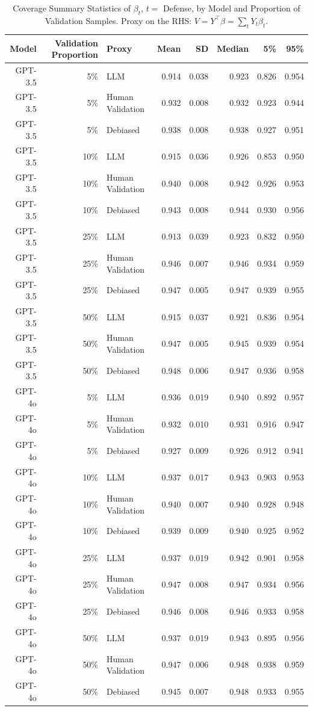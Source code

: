 \begin{table}

\caption{\label{tab:unnamed-chunk-1}Coverage Summary Statistics of $\beta_{t}$, $t=$ Defense, by Model and Proportion of Validation Samples.
      Proxy on the RHS: $V = Y^\top \beta = \sum_{t} Y_t \beta_t$.}
\centering
\begin{tabular}[t]{rrlrrrrr}
\toprule
Model & Validation Proportion & Proxy & Mean & SD & Median & 5\% & 95\%\\
\midrule
GPT-3.5 & 5\% & LLM & 0.914 & 0.038 & 0.923 & 0.826 & 0.954\\
GPT-3.5 & 5\% & Human Validation & 0.932 & 0.008 & 0.932 & 0.923 & 0.944\\
GPT-3.5 & 5\% & Debiased & 0.938 & 0.008 & 0.938 & 0.927 & 0.951\\
GPT-3.5 & 10\% & LLM & 0.915 & 0.036 & 0.926 & 0.853 & 0.950\\
GPT-3.5 & 10\% & Human Validation & 0.940 & 0.008 & 0.942 & 0.926 & 0.953\\
GPT-3.5 & 10\% & Debiased & 0.943 & 0.008 & 0.944 & 0.930 & 0.956\\
GPT-3.5 & 25\% & LLM & 0.913 & 0.039 & 0.923 & 0.832 & 0.950\\
GPT-3.5 & 25\% & Human Validation & 0.946 & 0.007 & 0.946 & 0.934 & 0.959\\
GPT-3.5 & 25\% & Debiased & 0.947 & 0.005 & 0.947 & 0.939 & 0.955\\
GPT-3.5 & 50\% & LLM & 0.915 & 0.037 & 0.921 & 0.836 & 0.954\\
GPT-3.5 & 50\% & Human Validation & 0.947 & 0.005 & 0.945 & 0.939 & 0.954\\
GPT-3.5 & 50\% & Debiased & 0.948 & 0.006 & 0.947 & 0.936 & 0.958\\
GPT-4o & 5\% & LLM & 0.936 & 0.019 & 0.940 & 0.892 & 0.957\\
GPT-4o & 5\% & Human Validation & 0.932 & 0.010 & 0.931 & 0.916 & 0.947\\
GPT-4o & 5\% & Debiased & 0.927 & 0.009 & 0.926 & 0.912 & 0.941\\
GPT-4o & 10\% & LLM & 0.937 & 0.017 & 0.943 & 0.903 & 0.953\\
GPT-4o & 10\% & Human Validation & 0.940 & 0.007 & 0.940 & 0.928 & 0.948\\
GPT-4o & 10\% & Debiased & 0.939 & 0.009 & 0.940 & 0.925 & 0.952\\
GPT-4o & 25\% & LLM & 0.937 & 0.019 & 0.942 & 0.901 & 0.958\\
GPT-4o & 25\% & Human Validation & 0.947 & 0.008 & 0.947 & 0.934 & 0.956\\
GPT-4o & 25\% & Debiased & 0.946 & 0.008 & 0.946 & 0.933 & 0.958\\
GPT-4o & 50\% & LLM & 0.937 & 0.019 & 0.943 & 0.895 & 0.956\\
GPT-4o & 50\% & Human Validation & 0.947 & 0.006 & 0.948 & 0.938 & 0.959\\
GPT-4o & 50\% & Debiased & 0.945 & 0.007 & 0.948 & 0.933 & 0.955\\
\bottomrule
\end{tabular}
\end{table}
